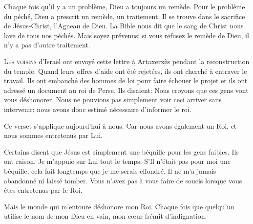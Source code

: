 Chaque fois qu'il y a un problème, Dieu a toujours un remède.
 Pour le problème du péché, Dieu a prescrit un remède, un traitement.
 Il se trouve dans le sacrifice de Jésus-Christ, l'Agneau de Dieu.
 La Bible nous dit que le sang de Christ nous lave de tous nos péchés.
 Mais soyez prévenus: si vous refusez le remède de Dieu,
 il n'y a pas d'autre traitement. 

\dvrule








\lettrine{L}{es voisins} d'Israël ont envoyé cette lettre à Artaxerxès
 pendant la reconstruction du temple.
 Quand leurs offres d'aide ont été rejetées,
 ils ont cherché à entraver le travail.
 Ils ont embauché des hommes de loi pour faire échouer le projet
 et ils ont adressé un document au roi de Perse.
 Ils disaient: \Og Nous croyons que ces gens vont vous déshonorer.
 Nous ne pouvions pas simplement voir ceci arriver sans intervenir;
 nous avons donc estimé nécessaire d'informer le roi. \Fg{}

Ce verset s'applique aujourd'hui à nous. Car nous avons également un Roi,
 et nous sommes entretenus par Lui.

Certains disent que Jésus est simplement une béquille pour les gens faibles.
 Ils ont raison. Je m'appuie sur Lui tout le temps.
 S'Il n'était pas pour moi une béquille,
 cela fait longtemps que je me serais effondré.
 Il ne m'a jamais abandonné ni laissé tomber.
 Vous n'avez pas à vous faire de soucis lorsque vous êtes entretenus par le Roi.

Mais le monde qui m'entoure déshonore mon Roi.
 Chaque fois que quelqu'un utilise le nom de mon Dieu en vain,
 mon c\oe{}ur frémit d'indignation. 


